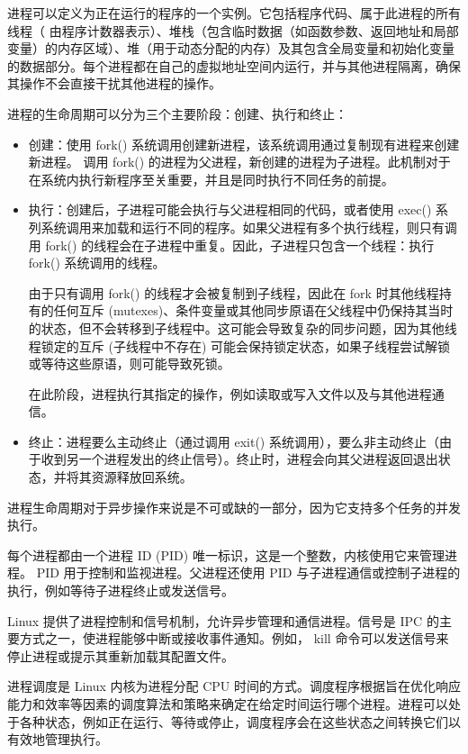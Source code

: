 
进程可以定义为正在运行的程序的一个实例。它包括程序代码、属于此进程的所有线程（ 由程序计数器表示）、堆栈（包含临时数据（如函数参数、返回地址和局部变量）的内存区域）、堆（用于动态分配的内存）及其包含全局变量和初始化变量的数据部分。每个进程都在自己的虚拟地址空间内运行，并与其他进程隔离，确保其操作不会直接干扰其他进程的操作。


进程的生命周期可以分为三个主要阶段：创建、执行和终止：

\begin{itemize}
\item
创建：使用 fork() 系统调用创建新进程，该系统调用通过复制现有进程来创建新进程。
调用 fork() 的进程为父进程，新创建的进程为子进程。此机制对于在系统内执行新程序至关重要，并且是同时执行不同任务的前提。

\item
执行：创建后，子进程可能会执行与父进程相同的代码，或者使用 exec() 系列系统调用来加载和运行不同的程序。如果父进程有多个执行线程，则只有调用 fork() 的线程会在子进程中重复。因此，子进程只包含一个线程：执行 fork() 系统调用的线程。

由于只有调用 fork() 的线程才会被复制到子线程，因此在 fork 时其他线程持有的任何互斥 (mutexes)、条件变量或其他同步原语在父线程中仍保持其当时的状态，但不会转移到子线程中。这可能会导致复杂的同步问题，因为其他线程锁定的互斥 (子线程中不存在) 可能会保持锁定状态，如果子线程尝试解锁或等待这些原语，则可能导致死锁。

在此阶段，进程执行其指定的操作，例如读取或写入文件以及与其他进程通信。

\item
终止：进程要么主动终止（通过调用 exit() 系统调用），要么非主动终止（由于收到另一个进程发出的终止信号）。终止时，进程会向其父进程返回退出状态，并将其资源释放回系统。
\end{itemize}

进程生命周期对于异步操作来说是不可或缺的一部分，因为它支持多个任务的并发执行。

每个进程都由一个进程 ID (PID) 唯一标识，这是一个整数，内核使用它来管理进程。 PID 用于控制和监视进程。父进程还使用 PID 与子进程通信或控制子进程的执行，例如等待子进程终止或发送信号。

Linux 提供了进程控制和信号机制，允许异步管理和通信进程。信号是 IPC 的主要方式之一，使进程能够中断或接收事件通知。例如， kill 命令可以发送信号来停止进程或提示其重新加载其配置文件。

进程调度是 Linux 内核为进程分配 CPU 时间的方式。调度程序根据旨在优化响应能力和效率等因素的调度算法和策略来确定在给定时间运行哪个进程。进程可以处于各种状态，例如正在运行、等待或停止，调度程序会在这些状态之间转换它们以有效地管理执行。


